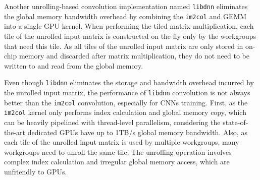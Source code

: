 \documentclass{article}
\begin{document}
Another unrolling-based convolution implementation named \texttt{libdnn} \cite{tschopp2016efficient, Tschoppgithub} eliminates the global memory bandwidth overhead by combining the \texttt{im2col} and GEMM into a single GPU kernel. When performing the tiled matrix multiplication, each tile of the unrolled input matrix is constructed on the fly only by the workgroups that need this tile. As all tiles of the unrolled input matrix are only stored in on-chip memory and discarded after matrix multiplication, they do not need to be written to and read from the global memory.


Even though \texttt{libdnn} eliminates the storage and bandwidth overhead incurred by the unrolled input matrix, the performance of \texttt{libdnn} convolution is not always better than the \texttt{im2col} convolution, especially for CNNs training. First, as the \texttt{im2col} kernel only performs index calculation and global memory copy, which can be heavily pipelined with thread-level parallelism, considering the state-of-the-art dedicated GPUs have up to 1TB/s global memory bandwidth. Also, as each tile of the unrolled input matrix is used by multiple workgroups, many workgroups need to unroll the same tile. The unrolling operation involves complex index calculation and irregular global memory access, which are unfriendly to GPUs.




\end{document}
